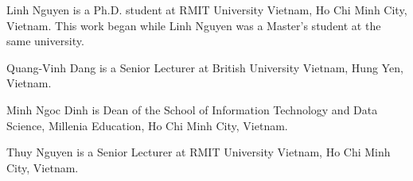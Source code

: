 \documentclass{ieeeaccess}
\begin{document}



\begin{IEEEbiographynophoto}{Linh Nguyen}
is a Ph.D. student at RMIT University Vietnam, Ho Chi Minh City, Vietnam. This work began while Linh Nguyen was a Master's student at the same university.
\end{IEEEbiographynophoto}

\begin{IEEEbiographynophoto}{Quang-Vinh Dang}
is a Senior Lecturer at British University Vietnam, Hung Yen, Vietnam.
\end{IEEEbiographynophoto}

\begin{IEEEbiographynophoto}{Minh Ngoc Dinh}
is Dean of the School of Information Technology and Data Science, Millenia Education, Ho Chi Minh City, Vietnam.
\end{IEEEbiographynophoto}

\begin{IEEEbiographynophoto}{Thuy Nguyen}
is a Senior Lecturer at RMIT University Vietnam, Ho Chi Minh City, Vietnam.
\end{IEEEbiographynophoto}


\vfill

\EOD
\end{document}
